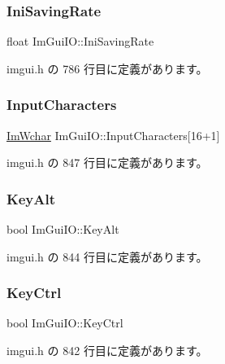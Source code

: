 \subsubsection{\texorpdfstring{Ini\+Saving\+Rate}{IniSavingRate}}
{\footnotesize\ttfamily float Im\+Gui\+I\+O\+::\+Ini\+Saving\+Rate}



 imgui.\+h の 786 行目に定義があります。

\mbox{\label{struct_im_gui_i_o_af6283418a2bff9db1522a6245476c7ed}} 
\subsubsection{\texorpdfstring{Input\+Characters}{InputCharacters}}
{\footnotesize\ttfamily \mbox{\hyperlink{imgui_8h_af2c7badaf05a0008e15ef76d40875e97}{Im\+Wchar}} Im\+Gui\+I\+O\+::\+Input\+Characters\mbox{[}16+1\mbox{]}}



 imgui.\+h の 847 行目に定義があります。

\mbox{\label{struct_im_gui_i_o_a1e64ef08a4448a2cac874496130992cb}} 
\subsubsection{\texorpdfstring{Key\+Alt}{KeyAlt}}
{\footnotesize\ttfamily bool Im\+Gui\+I\+O\+::\+Key\+Alt}



 imgui.\+h の 844 行目に定義があります。

\mbox{\label{struct_im_gui_i_o_a51de8f65dcabb80ef4e0d3c759ffcd7f}} 
\subsubsection{\texorpdfstring{Key\+Ctrl}{KeyCtrl}}
{\footnotesize\ttfamily bool Im\+Gui\+I\+O\+::\+Key\+Ctrl}



 imgui.\+h の 842 行目に定義があります。

